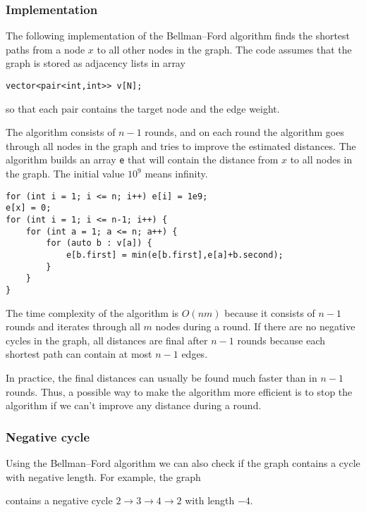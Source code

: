 \subsubsection{Implementation}

The following implementation of the
Bellman–Ford algorithm finds the shortest paths
from a node $x$ to all other nodes in the graph.
The code assumes that the graph is stored
as adjacency lists in array
\begin{lstlisting}
vector<pair<int,int>> v[N];
\end{lstlisting}
so that each pair contains the target node
and the edge weight.

The algorithm consists of $n-1$ rounds,
and on each round the algorithm goes through
all nodes in the graph and tries to improve
the estimated distances.
The algorithm builds an array \texttt{e}
that will contain the distance from $x$
to all nodes in the graph.
The initial value $10^9$ means infinity.

\begin{lstlisting}
for (int i = 1; i <= n; i++) e[i] = 1e9;
e[x] = 0;
for (int i = 1; i <= n-1; i++) {
    for (int a = 1; a <= n; a++) {
        for (auto b : v[a]) {
            e[b.first] = min(e[b.first],e[a]+b.second);
        }
    }
}
\end{lstlisting}

The time complexity of the algorithm is $O(nm)$
because it consists of $n-1$ rounds and
iterates through all $m$ nodes during a round.
If there are no negative cycles in the graph,
all distances are final after $n-1$ rounds
because each shortest path can contain at most $n-1$ edges.

In practice, the final distances can usually
be found much faster than in $n-1$ rounds.
Thus, a possible way to make the algorithm more efficient
is to stop the algorithm if we can't
improve any distance during a round.

\subsubsection{Negative cycle}


Using the Bellman–Ford algorithm we can also
check if the graph contains a cycle with negative length.
For example, the graph

\begin{center}
\end{center}
\noindent
contains a negative cycle
$2 \rightarrow 3 \rightarrow 4 \rightarrow 2$
with length $-4$.


